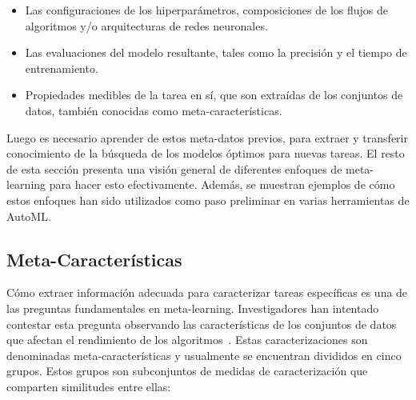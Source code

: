 \begin{itemize}
	\item Las configuraciones de los hiperparámetros, composiciones de los
    flujos de algoritmos y/o arquitecturas de redes neuronales.
	\item Las evaluaciones del modelo resultante, tales como la precisión y el
    tiempo de entrenamiento.
	\item Propiedades medibles de la tarea en sí, que son extraídas de los
    conjuntos de datos, también conocidas como meta-características.
\end{itemize}

Luego es necesario aprender de estos meta-datos previos, para extraer y
transferir conocimiento de la búsqueda de los modelos óptimos para nuevas
tareas. El resto de esta sección presenta una visión general de diferentes
enfoques de meta-learning para hacer esto efectivamente. Además, se muestran
ejemplos de cómo estos enfoques han sido utilizados como paso preliminar en
varias herramientas de AutoML.

\subsection{Meta-Características}

Cómo extraer información adecuada para caracterizar tareas específicas es una
de las preguntas fundamentales en meta-learning. Investigadores han intentado
contestar esta pregunta observando las características de los conjuntos de datos
que afectan el rendimiento de los algoritmos~\cite{Rivolli2018TowardsRE}. Estas
caracterizaciones son denominadas meta-características y usualmente se
encuentran divididos en cinco grupos. Estos grupos son subconjuntos de medidas
de caracterización \cite{bradzil2009metalearning} que comparten similitudes
entre ellas:

